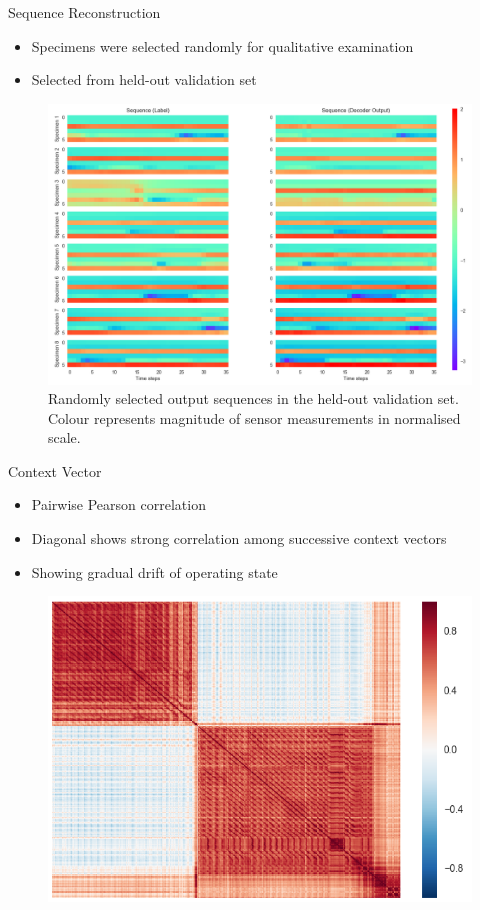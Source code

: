 \documentclass{beamer}
\begin{document}
\begin{frame}[shrink]{Sequence Reconstruction}
  \begin{itemize}
    \item Specimens were selected randomly for qualitative examination
    \item Selected from held-out validation set
  \end{itemize}
  \begin{figure}[H]
  	\centering
  	\includegraphics[width=1\textwidth]{heatmaps.png}
  	\caption{Randomly selected output sequences in the held-out validation set. Colour represents magnitude of sensor measurements in normalised scale.}
  \end{figure}
\end{frame}


\begin{frame}[shrink]{Context Vector}
  \begin{itemize}
    \item Pairwise Pearson correlation
    \item Diagonal shows strong correlation among successive context vectors
    \item Showing gradual drift of operating state
  \end{itemize}
  \begin{figure}[H]
  	\centering
  	\includegraphics[width=1\textwidth]{matrix.PNG}
  \end{figure}
\end{frame}
\end{document}
